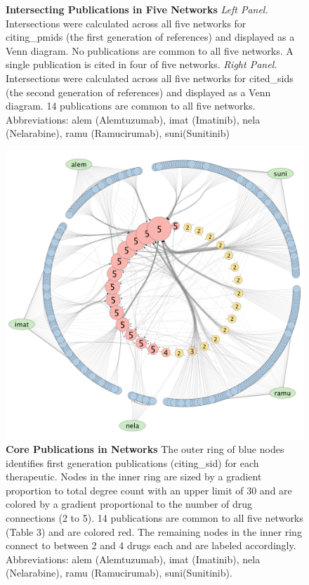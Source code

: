 \documentclass[10pt,letterpaper]{article}
\begin{document}
\begin{figure}[!h]
\begin{subfigure}{.5\textwidth}
  \label{fig:sub2}
\end{subfigure}
\caption{{\bf Intersecting Publications in Five Networks}  \emph{Left Panel.} Intersections were calculated across all five networks for citing\_pmids (the first generation of references) and displayed as a Venn diagram.
No publications are common to all five networks. A single publication is cited in four of five networks. \emph{Right Panel.} Intersections were calculated across all five networks for cited\_sids (the second generation of references) and displayed as a Venn diagram.
14  publications are common to all five networks. Abbreviations: alem (Alemtuzumab), imat (Imatinib), nela (Nelarabine), ramu (Ramucirumab), suni(Sunitinib)}
\label{fig:test}
\end{figure}

\begin{figure}[!h]
\centering
\includegraphics[scale=0.1]{cy_core14_v2csv_6b.png}
\caption{{\bf Core Publications in Networks}  The outer ring of blue nodes identifies first generation publications (citing\_sid) for each therapeutic. Nodes in the inner ring are sized by a gradient proportion to total degree count with an upper limit of 30 and are colored by a gradient proportional to the number of drug connections (2 to 5). 14  publications are common to all five networks (Table 3) and are colored red. The remaining nodes in the inner ring connect to between 2 and 4 drugs each and are labeled accordingly. Abbreviations: alem (Alemtuzumab), imat (Imatinib), nela (Nelarabine), ramu (Ramucirumab), suni(Sunitinib).}
\label{fig3}
\end{figure}
\clearpage
\end{document}
